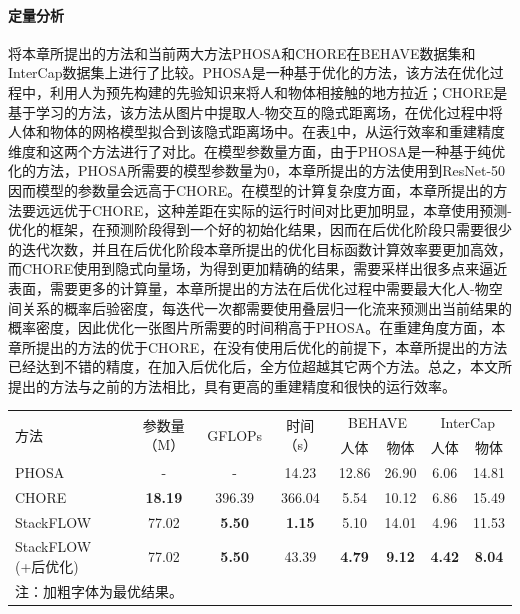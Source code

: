 \paragraph{定量分析}
将本章所提出的方法和当前两大方法PHOSA和CHORE在BEHAVE数据集和InterCap数据集上进行了比较。PHOSA\citep{zhang2020phosa}是一种基于优化的方法，该方法在优化过程中，利用人为预先构建的先验知识来将人和物体相接触的地方拉近；CHORE\citep{xie2022chore}是基于学习的方法，该方法从图片中提取人-物交互的隐式距离场，在优化过程中将人体和物体的网格模型拟合到该隐式距离场中。在表\ref{tab:stackflow_behave_performance}中，从运行效率和重建精度维度和这两个方法进行了对比。在模型参数量方面，由于PHOSA是一种基于纯优化的方法，PHOSA所需要的模型参数量为0，本章所提出的方法使用到ResNet-50因而模型的参数量会远高于CHORE。在模型的计算复杂度方面，本章所提出的方法要远远优于CHORE，这种差距在实际的运行时间对比更加明显，本章使用预测-优化的框架，在预测阶段得到一个好的初始化结果，因而在后优化阶段只需要很少的迭代次数，并且在后优化阶段本章所提出的优化目标函数计算效率要更加高效，而CHORE使用到隐式向量场，为得到更加精确的结果，需要采样出很多点来逼近表面，需要更多的计算量，本章所提出的方法在后优化过程中需要最大化人-物空间关系的概率后验密度，每迭代一次都需要使用叠层归一化流来预测出当前结果的概率密度，因此优化一张图片所需要的时间稍高于PHOSA。在重建角度方面，本章所提出的方法的优于CHORE，在没有使用后优化的前提下，本章所提出的方法已经达到不错的精度，在加入后优化后，全方位超越其它两个方法。总之，本文所提出的方法与之前的方法相比，具有更高的重建精度和很快的运行效率。

\begin{table}[!htbp]
	\label{tab:stackflow_behave_performance}
	\centering
	\footnotesize
	\setlength{\tabcolsep}{4pt}
	\renewcommand{\arraystretch}{1.2}
	\begin{tabular}{lccccccc}
		\toprule
		\multirow{2}{*}{方法} & \multirow{2}{*}{参数量（M）} & \multirow{2}{*}{GFLOPs} & \multirow{2}{*}{时间（s）} & \multicolumn{2}{c}{BEHAVE} & \multicolumn{2}{c}{InterCap} \\
		\cline{5-8}
		& & & & 人体 & 物体 & 人体 & 物体 \\
		\hline
		PHOSA & - & - & 14.23 & 12.86 & 26.90 & 6.06 & 14.81 \\
		CHORE & \textbf{18.19} & 396.39 & 366.04 & 5.54 & 10.12 & 6.86 & 15.49 \\
		StackFLOW & 77.02 & \textbf{5.50} & \textbf{1.15} & 5.10 & 14.01 & 4.96 & 11.53 \\
		StackFLOW (+后优化) & 77.02 & \textbf{5.50} & 43.39 & \textbf{4.79} & \textbf{9.12} & \textbf{4.42} & \textbf{8.04} \\
		\bottomrule
		\multicolumn{6}{l}{注：加粗字体为最优结果。}
	\end{tabular}
\end{table}

